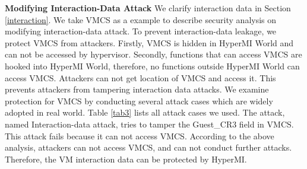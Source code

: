 \documentclass[conference]{IEEEtran}
\begin{document}


\textbf{Modifying Interaction-Data Attack}
We clarify interaction data in Section \ref{interaction}. We take VMCS as a example to describe security analysis on modifying interaction-data attack.
 To prevent interaction-data leakage, we protect VMCS from attackers. Firstly, VMCS is hidden in HyperMI World and can not be accessed by hypervisor. Secondly, functions that can access VMCS are hooked into HyperMI World, therefore, no functions outside HyperMI World can access VMCS. Attackers can not get location of VMCS and access it. This prevents attackers from tampering interaction data attacks. We examine protection for VMCS by conducting several attack cases which are widely adopted in real world. Table \ref{tab3} lists all attack cases we used. The attack, named Interaction-data attack, tries to tamper the Guest\_CR3 field in VMCS. This attack fails because it can not access VMCS. 
  According to the above analysis, attackers can not access VMCS, and can not conduct further attacks. Therefore, the VM interaction data can be protected by HyperMI.


\end{document}
